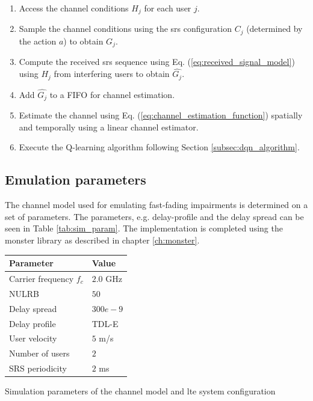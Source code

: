 \begin{enumerate}
    \item Access the channel conditions $H_j$ for each user $j$.
    \item Sample the channel conditions using the \gls{srs} configuration $C_j$ (determined by the action $a$) to obtain $G_j$.
    \item Compute the received \gls{srs} sequence using Eq. (\ref{eq:received_signal_model}) using $H_j$ from interfering users to obtain $\hat{G_j}$.
    \item Add $\hat{G_j}$ to a FIFO for channel estimation.
    \item Estimate the channel using Eq. (\ref{eq:channel_estimation_function}) spatially and temporally using a linear channel estimator.
    \item Execute the Q-learning algorithm following Section \ref{subsec:dqn_algorithm}.
\end{enumerate}

\subsection{Emulation parameters}
The channel model used for emulating fast-fading impairments is determined on a set of parameters. The parameters, e.g. delay-profile and the delay spread can be seen in Table \ref{tab:sim_param}. The implementation is completed using the \gls{monster} library as described in chapter \ref{ch:monster}. 

\begin{margintable}
\centering
\footnotesize{
\begin{tabular}{l|l}
\toprule
\textbf{Parameter}                 & \textbf{Value} \\ \midrule
Carrier frequency $f_c$ & $2.0$ GHz \\
NULRB         & $50$             \\
Delay spread  & $300e-9$         \\
Delay profile & TDL-E          \\
User velocity & $5$ m/s \\   
Number of users & $2$ \\
SRS periodicity & $2$ ms 
\end{tabular}
\vspace{1em}
\caption{Simulation parameters of the channel model and \gls{lte} system configuration}
\label{tab:sim_param}
}
\end{margintable}


